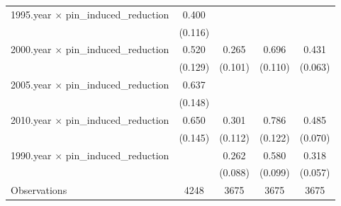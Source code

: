 \begin{table}[h]
{\begin{tabular}{l*{4}{c}}
1995.year $\times$ pin\_induced\_reduction&       0.400\sym{***}&                     &                     &                     \\
                    &     (0.116)         &                     &                     &                     \\
2000.year $\times$ pin\_induced\_reduction&       0.520\sym{***}&       0.265\sym{***}&       0.696\sym{***}&       0.431\sym{***}\\
                    &     (0.129)         &     (0.101)         &     (0.110)         &     (0.063)         \\
2005.year $\times$ pin\_induced\_reduction&       0.637\sym{***}&                     &                     &                     \\
                    &     (0.148)         &                     &                     &                     \\
2010.year $\times$ pin\_induced\_reduction&       0.650\sym{***}&       0.301\sym{***}&       0.786\sym{***}&       0.485\sym{***}\\
                    &     (0.145)         &     (0.112)         &     (0.122)         &     (0.070)         \\
1990.year $\times$ pin\_induced\_reduction&                     &       0.262\sym{***}&       0.580\sym{***}&       0.318\sym{***}\\
                    &                     &     (0.088)         &     (0.099)         &     (0.057)         \\
\hline
Observations        &        4248         &        3675         &        3675         &        3675         \\
\hline\hline
\end{tabular}}
\end{table}
